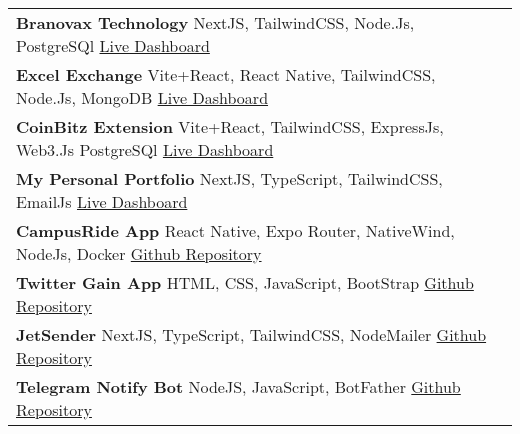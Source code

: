 \documentclass{article}
\newcommand{\sectionnumber}[1]{\textbf{#1}}
\newcommand{\contactinfo}[1]{{\fontsize{11.5pt}{12pt}\selectfont #1}}
\newcommand{\sectiondivider}[2][0.4]{%
    \noindent
    \vspace{3pt}
    \textcolor{black}{%
        \noindent
        \makebox[\linewidth]{\rule{#1\linewidth}{0.5pt}%
        \hspace{5pt} \textbf{\uppercase{#2}} \hspace{5pt}%
        \rule{#1\linewidth}{0.5pt}}%
    }
    \vspace{3pt}
}
\begin{document}
\vspace{0.5cm}

\sectiondivider[0.46]{Projects} \\
\noindent
\begin{tabular}{p{} r}
    \sectionnumber{\large{Branovax Technology}} \textbar{} NextJS, TailwindCSS, Node.Js, PostgreSQl \textbar{} \contactinfo{ \href{https://branovax.com}{Live Dashboard}} \\[0.4cm]
    \sectionnumber{\large{Excel Exchange}} \textbar{} Vite+React, React Native, TailwindCSS, Node.Js, MongoDB \textbar{} \contactinfo{ \href{https://excelexchange.vercel.app}{Live Dashboard}} \\[0.4cm]
    \sectionnumber{\large{CoinBitz Extension}} \textbar{} Vite+React, TailwindCSS, ExpressJs, Web3.Js PostgreSQl \textbar{} \contactinfo{ \href{https://coinbit-extension.vercel.app}{Live Dashboard}} \\[0.4cm]
    \sectionnumber{\large{My Personal Portfolio}} \textbar{} NextJS, TypeScript, TailwindCSS, EmailJs \textbar{} \contactinfo{ \href{https://hadiademola.vercel.app}{Live Dashboard}} \\[0.4cm]
    \sectionnumber{\large{CampusRide App}} \textbar{} React Native, Expo Router, NativeWind, NodeJs, Docker \textbar{} \contactinfo{ \href{https://github.com/Hardeygold205/CampusRide}{Github Repository}} \\[0.4cm]
    \sectionnumber{\large{Twitter Gain App}} \textbar{} HTML, CSS, JavaScript, BootStrap \textbar{} \contactinfo{ \href{https://github.com/Hardeygold205/twitter-gain-app}{Github Repository}} \\[0.4cm]
    \sectionnumber{\large{JetSender}} \textbar{} NextJS, TypeScript, TailwindCSS, NodeMailer \textbar{} \contactinfo{ \href{https://github.com/Hardeygold205/BulkEMailSender}{Github Repository}} \\[0.4cm]
    \sectionnumber{\large{Telegram Notify Bot}} \textbar{} NodeJS, JavaScript, BotFather \textbar{} \contactinfo{ \href{https://github.com/Hardeygold205/NottifyBot}{Github Repository}} \\
\end{tabular}

\vspace{0.1cm}

\newpage
\end{document}
